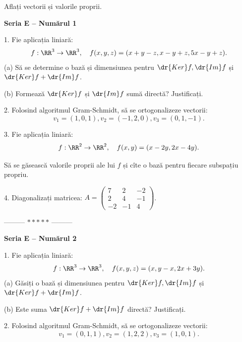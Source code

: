 Aflați vectorii și valorile proprii.

\newpage

\textbf{Seria E -- Numărul 1}

1. Fie aplicația liniară:
\[
  f : \RR^3 \to \RR^3, \quad f(x, y, z) = (x + y - z, x - y + z, 5x - y + z).
\]
(a) Să se determine o bază și dimensiunea pentru $ \dr{Ker}f, \dr{Im}f $ și
$ \dr{Ker}f + \dr{Im}f $.

(b) Formează $ \dr{Ker}f $ și $ \dr{Im}f $ sumă directă? Justificați.

\vspace{0.5cm}

2. Folosind algoritmul Gram-Schmidt, să se ortogonalizeze vectorii:
\[
  v_1 = (1, 0, 1), v_2 = (-1, 2, 0), v_3 = (0, 1, -1).
\]

\vspace{0.5cm}

3. Fie aplicația liniară:
\[
  f : \RR^2 \to \RR^2, \quad f(x, y) = (x - 2y, 2x - 4y).
\]

Să se găsească valorile proprii ale lui $ f $ și cîte o bază pentru fiecare
subspațiu propriu.

\vspace{0.5cm}

4. Diagonalizați matricea:
$ A = \begin{pmatrix}
  7 & 2 & -2 \\
  2 & 4 & -1 \\
  -2 & -1 & 4
\end{pmatrix} $.

\vspace{0.5cm}
\begin{center}
  --------- $\ast\ast\ast\ast\ast$ ---------
\end{center}
\vspace{0.5cm}

\textbf{Seria E -- Numărul 2}


1. Fie aplicația liniară:
\[
  f : \RR^3 \to \RR^3, \quad f(x, y, z) = (x, y - x, 2x + 3y).
\]
(a) Găsiți o bază și dimensiunea pentru $ \dr{Ker}f, \dr{Im}f $ și $ \dr{Ker}f + \dr{Im}f $.

(b) Este suma $ \dr{Ker}f + \dr{Im}f $ directă? Justificați.

\vspace{0.5cm}

2. Folosind algoritmul Gram-Schmidt, să se ortogonalizeze vectorii:
\[
  v_1 = (0, 1, 1), v_2 = (1, 2, 2), v_3 = (1, 0, 1).
\]

\vspace{0.5cm}

